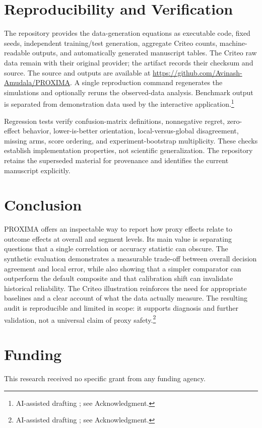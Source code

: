 \documentclass{ieeeaccess}
\begin{document}
\section{Reproducibility and Verification}
The repository provides the data-generation equations as executable code, fixed seeds, independent training/test generation, aggregate Criteo counts, machine-readable outputs, and automatically generated manuscript tables. The Criteo raw data remain with their original provider; the artifact records their checksum and source. The source and outputs are available at \url{https://github.com/Avinash-Amudala/PROXIMA}. A single reproduction command regenerates the simulations and optionally reruns the observed-data analysis. Benchmark output is separated from demonstration data used by the interactive application.\footnote{AI-assisted drafting \cite{codex}; see Acknowledgment.}

Regression tests verify confusion-matrix definitions, nonnegative regret, zero-effect behavior, lower-is-better orientation, local-versus-global disagreement, missing arms, score ordering, and experiment-bootstrap multiplicity. These checks establish implementation properties, not scientific generalization. The repository retains the superseded material for provenance and identifies the current manuscript explicitly.

\section{Conclusion}
PROXIMA offers an inspectable way to report how proxy effects relate to outcome effects at overall and segment levels. Its main value is separating questions that a single correlation or accuracy statistic can obscure. The synthetic evaluation demonstrates a measurable trade-off between overall decision agreement and local error, while also showing that a simpler comparator can outperform the default composite and that calibration shift can invalidate historical reliability. The Criteo illustration reinforces the need for appropriate baselines and a clear account of what the data actually measure. The resulting audit is reproducible and limited in scope: it supports diagnosis and further validation, not a universal claim of proxy safety.\footnote{AI-assisted drafting \cite{codex}; see Acknowledgment.}

\section*{Funding}
This research received no specific grant from any funding agency.
\end{document}
